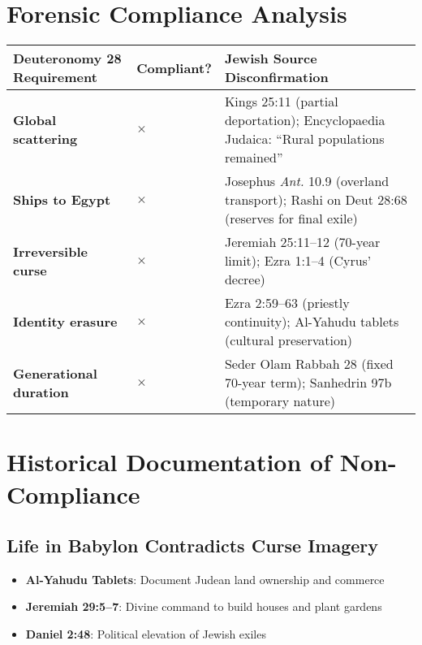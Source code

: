 \documentclass[12pt]{article}
\begin{document}
\section{Forensic Compliance Analysis}

\begin{center}
\renewcommand{\arraystretch}{1.3}
\begin{tabular}{@{} >{\RaggedRight\arraybackslash}p{4.8cm} >{\centering\arraybackslash}p{1.5cm} >{\RaggedRight\arraybackslash}p{7.5cm} @{}}
\toprule
\textbf{Deuteronomy 28 Requirement} & \textbf{Compliant?} & \textbf{Jewish Source Disconfirmation} \\
\midrule
\textbf{Global scattering} & $\times$ & 2 Kings 25:11 (partial deportation); Encyclopaedia Judaica: “Rural populations remained” \\
\textbf{Ships to Egypt} & $\times$ & Josephus \textit{Ant.} 10.9 (overland transport); Rashi on Deut 28:68 (reserves for final exile) \\
\textbf{Irreversible curse} & $\times$ & Jeremiah 25:11–12 (70-year limit); Ezra 1:1–4 (Cyrus' decree) \\
\textbf{Identity erasure} & $\times$ & Ezra 2:59–63 (priestly continuity); Al-Yahudu tablets (cultural preservation) \\
\textbf{Generational duration} & $\times$ & Seder Olam Rabbah 28 (fixed 70-year term); Sanhedrin 97b (temporary nature) \\
\bottomrule
\end{tabular}
\end{center}

\section{Historical Documentation of Non-Compliance}

\subsection{Life in Babylon Contradicts Curse Imagery}
\begin{itemize}
    \item \textbf{Al-Yahudu Tablets}: Document Judean land ownership and commerce
    \item \textbf{Jeremiah 29:5–7}: Divine command to build houses and plant gardens
    \item \textbf{Daniel 2:48}: Political elevation of Jewish exiles
\end{itemize}
\end{document}
